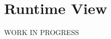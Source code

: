 \documentclass[../../DD.tex]{subfiles}
\begin{document}
\section{Runtime View}
	WORK IN PROGRESS
	
\end{document}
